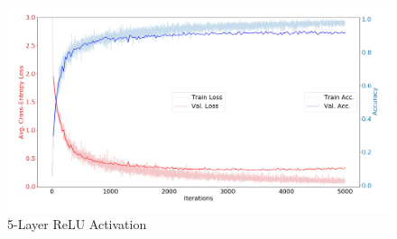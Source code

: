 \documentclass{article}
\begin{document}
        \begin{figure}[h]
            \includegraphics[width=\textwidth]{"L_5_ReLU.png"}
            \caption{5-Layer ReLU Activation}
        \end{figure}
        \clearpage





    
            
\end{document}
